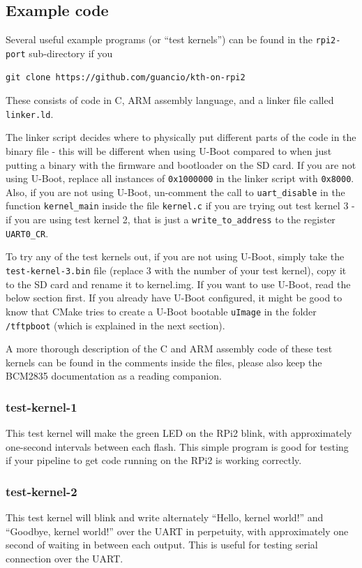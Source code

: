 \documentclass[a4paper,11pt,reqno]{amsart}
\begin{document}
{\subsection{Example code}
Several useful example programs (or ``test kernels'') can be found in the \texttt{rpi2-port} sub-directory if you

\begin{verbatim}
git clone https://github.com/guancio/kth-on-rpi2
\end{verbatim}

These consists of code in C, ARM assembly language, and a linker file called \texttt{linker.ld}.

The linker script decides where to physically put different parts of the code in the binary file - this will be different when using U-Boot compared to when just putting a binary with the firmware and bootloader on the SD card. If you are not using U-Boot, replace all instances of  \texttt{0x1000000} in the linker script with \texttt{0x8000}. Also, if you are not using U-Boot, un-comment the call to \texttt{uart\_disable} in the function \texttt{kernel\_main} inside the file \texttt{kernel.c} if you are trying out test kernel 3 - if you are using test kernel 2, that is just a \texttt{write\_to\_address} to the register \texttt{UART0\_CR}.

To try any of the test kernels out, if you are not using U-Boot, simply take the \texttt{test-kernel-3.bin} file (replace 3 with the number of your test kernel), copy it to the SD card and rename it to kernel.img. If you want to use U-Boot, read the below section first. If you already have U-Boot configured, it might be good to know that CMake tries to create a U-Boot bootable \texttt{uImage} in the folder \texttt{/tftpboot} (which is explained in the next section).

A more thorough description of the C and ARM assembly code of these test kernels can be found in the comments inside the files, please also keep the BCM2835 documentation as a reading companion.

\subsubsection{test-kernel-1}
This test kernel will make the green LED on the RPi2 blink, with approximately one-second intervals between each flash. This simple program is good for testing if your pipeline to get code running on the RPi2 is working correctly.

\subsubsection{test-kernel-2}
This test kernel will blink and write alternately ``Hello, kernel world!'' and ``Goodbye, kernel world!'' over the UART in perpetuity, with approximately one second of waiting in between each output. This is useful for testing serial connection over the UART.

}
\end{document}
